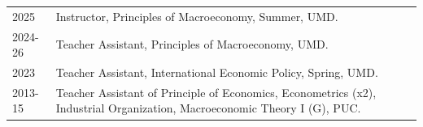 
% 
\begin{longtable}[l]{@{}p{} p{}}
 2025 & Instructor, Principles of Macroeconomy, Summer, UMD. \\
  2024-26 & Teacher Assistant, Principles of Macroeconomy, UMD. \\
 2023 &   Teacher Assistant, International Economic Policy, Spring, UMD. \\
 2013-15 &  Teacher Assistant of Principle of Economics, Econometrics (x2), Industrial Organization, Macroeconomic Theory I (G), PUC.
\end{longtable}
